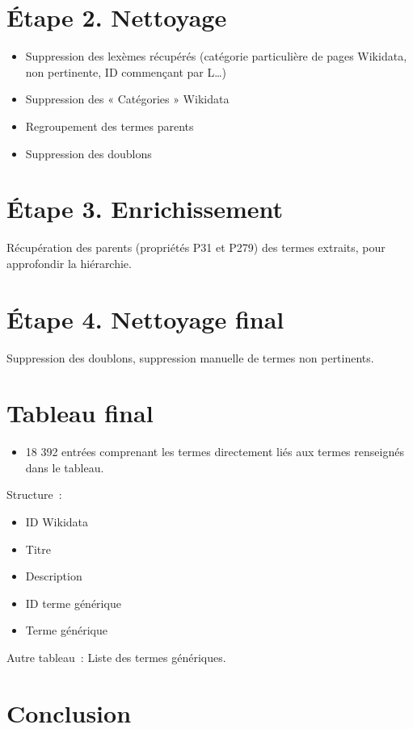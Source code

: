 \section*{Étape 2. Nettoyage}

\begin{itemize}
	\item Suppression des lexèmes récupérés (catégorie particulière de pages Wikidata, non pertinente, ID commençant par L\ldots)
	\item Suppression des « Catégories » Wikidata
	\item Regroupement des termes parents
	\item Suppression des doublons
\end{itemize}

\section*{Étape 3. Enrichissement}

Récupération des parents (propriétés P31 et P279) des termes extraits, pour approfondir la hiérarchie.

\section*{Étape 4. Nettoyage final}

Suppression des doublons, suppression manuelle de termes non pertinents.

\section*{Tableau final}

\begin{itemize}
	\item 18 392 entrées comprenant les termes directement liés aux termes renseignés dans le tableau.
\end{itemize}

Structure~:
\begin{itemize}
	\item ID Wikidata
	\item Titre
	\item Description
	\item ID terme générique
	\item Terme générique
\end{itemize}

Autre tableau~: Liste des termes génériques.

\section*{Conclusion}

